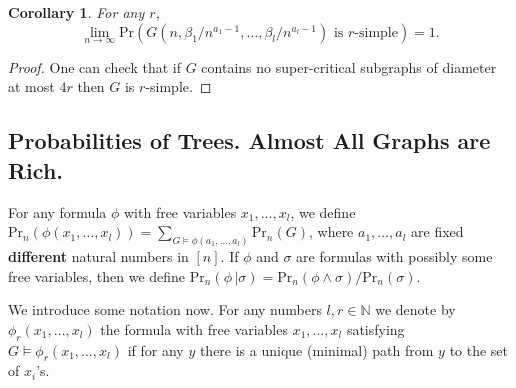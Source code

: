 \documentclass[11pt,notitlepage,a4paper]{article}
\newtheorem{corollary}{Corollary}[section]
\theoremstyle{definition}
\newcommand{\N}{\mathbb{N}}
\newcommand{\Ln}{\lim\limits_{n\to \infty}}
\begin{document}
\begin{corollary} \label{thm:simple} 
	For any $r$,
	\[\Ln \mathrm{Pr}(G(n,\beta_1/n^{a_1-1}, \dots,\beta_l/n^{a_l-1} ) \text{ is }r \text{-simple})=1 .\]
\end{corollary}
\begin{proof}
	One can check that if $G$ contains no super-critical subgraphs of
	diameter at most $4r$ then $G$ is $r$-simple.
\end{proof}


\subsection{Probabilities of Trees. Almost All Graphs are Rich.}



For any formula $\phi$ with free variables 
$x_1, \dots, x_l$, we define $\mathrm{Pr}_n(\phi(x_1,\dots,x_l))=
\sum\limits_{G\models \phi(a_1,\dots,a_l)} \mathrm{Pr}_n(G) $, 
where $a_1, \dots, a_l$ are fixed \textbf{different}
natural numbers in $[n]$. If $\phi$ and $\sigma$ are 
formulas with possibly some free variables, then we define
$\mathrm{Pr}_n(\phi \, | \sigma)=\mathrm{Pr}_n(\phi\wedge \sigma)/\mathrm{Pr}_n(\sigma)$. \par

We introduce some notation now. For any numbers $l,r\in \N$ 
we denote by $\phi_r(x_1,\dots, x_l)$ the formula
with free variables $x_1,\dots, x_l$
satisfying $G\models \phi_r(x_1,\dots, x_l)$ 
if for any $y$ there is a unique
(minimal) path from $y$ to the set of $x_i$'s. 
\end{document}
